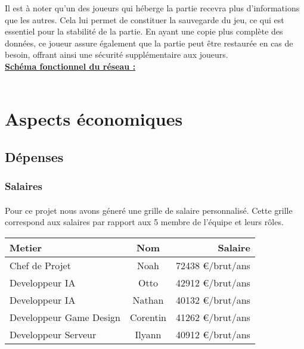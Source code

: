 \documentclass{article}
\begin{document}
Il est à noter qu'un des joueurs qui héberge la partie recevra plus d'informations que les autres. Cela lui permet de constituer la sauvegarde du jeu, ce qui est essentiel pour la stabilité de la partie. En ayant une copie plus complète des données, ce joueur assure également que la partie peut être restaurée en cas de besoin, offrant ainsi une sécurité supplémentaire aux joueurs. \pagebreak \\
\textbf{\underline{Schéma fonctionnel du réseau :}}\\ \\
\normalsize
{}
\large
\section{Aspects économiques}
\subsection{Dépenses}
\subsubsection{Salaires}
\paragraph{} Pour ce projet nous avons géneré une grille de salaire personnalisé. Cette grille correspond aux salaires par rapport aux 5 membre de l'équipe et leurs r\^oles.\\

\begin{tabular}{ | l | c | r | } \hline
   \textbf{Metier} & \textbf{Nom} & \textbf{Salaire} \\ \hline
   Chef de Projet & Noah & 72438 €/brut/ans \\ \hline
   Developpeur IA & Otto & 42912 €/brut/ans  \\ \hline
   Developpeur IA & Nathan & 40132 €/brut/ans  \\ \hline
   Developpeur Game Design & Corentin & 41262 €/brut/ans \\ \hline
   Developpeur Serveur & Ilyann & 40912 €/brut/ans \\ \hline
\end{tabular}
\end{document}
